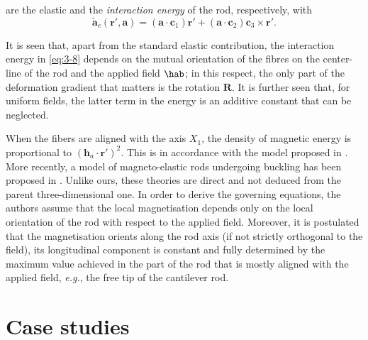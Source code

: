 \documentclass[oneside]{article}
\begin{document}
			are the elastic and the \emph{interaction energy} of the rod, respectively, with 
			\begin{equation}\label{currorient}
			\widetilde{\bm a}_c(\bm r',\bm a)=(\bm a\cdot\bm c_1)\bm r'+(\bm a\cdot\bm c_2)\bm c_3\times\bm r'.
			\end{equation} 
			
			It is seen that, apart from the standard elastic contribution, the interaction energy in \eqref{eq:3-8} depends on the mutual orientation of the fibres on the center-line of the rod and the applied field $\hab$; in this respect, the only part of the deformation gradient that matters is the rotation $\bm R$. It is further seen that, for uniform fields, the latter term in the energy is an additive constant that can be neglected. 
			
			When the fibers are aligned with the axis $X_1$, the density of magnetic energy is proportional to $(\bm h_a\cdot\bm r')^2$. This is in accordance with the model proposed in \cite{Cebers2003}. More recently, a model of magneto-elastic rods undergoing buckling has been proposed in \cite{Gerbal2015}. Unlike ours, these theories are direct and not deduced from the parent three-dimensional one. In order to derive the governing equations, the authors assume  that the local magnetisation depends only on the local orientation of the rod with respect to the applied field. Moreover, it is postulated that the magnetisation  orients along the rod axis (if not strictly orthogonal to the field), its longitudinal component is constant and fully determined by the maximum value achieved in the part of the rod that is mostly aligned with the applied field, \textit{e.g.}, the free tip of the cantilever rod.
			
			
			\section{Case studies}
			
\end{document}
